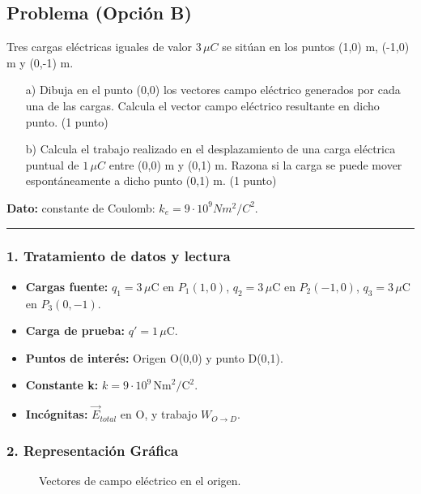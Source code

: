\newpage

\subsection{Problema (Opción B)}
\label{subsec:B4_2016_jun_ord_re}

\begin{cajaenunciado}
Tres cargas eléctricas iguales de valor $3\,\mu C$ se sitúan en los puntos (1,0) m, (-1,0) m y (0,-1) m.
\begin{enumerate}
    \item[a)] Dibuja en el punto (0,0) los vectores campo eléctrico generados por cada una de las cargas. Calcula el vector campo eléctrico resultante en dicho punto. (1 punto)
    \item[b)] Calcula el trabajo realizado en el desplazamiento de una carga eléctrica puntual de $1\,\mu C$ entre (0,0) m y (0,1) m. Razona si la carga se puede mover espontáneamente a dicho punto (0,1) m. (1 punto)
\end{enumerate}
\textbf{Dato:} constante de Coulomb: $k_{e}=9\cdot10^{9}Nm^{2}/C^{2}$.
\end{cajaenunciado}
\hrule

\subsubsection*{1. Tratamiento de datos y lectura}
\begin{itemize}
    \item \textbf{Cargas fuente:} $q_1 = 3\,\mu\text{C}$ en $P_1(1,0)$, $q_2 = 3\,\mu\text{C}$ en $P_2(-1,0)$, $q_3 = 3\,\mu\text{C}$ en $P_3(0,-1)$.
    \item \textbf{Carga de prueba:} $q' = 1\,\mu\text{C}$.
    \item \textbf{Puntos de interés:} Origen O(0,0) y punto D(0,1).
    \item \textbf{Constante k:} $k=9\cdot10^9\,\text{Nm}^2/\text{C}^2$.
    \item \textbf{Incógnitas:} $\vec{E}_{total}$ en O, y trabajo $W_{O \to D}$.
\end{itemize}

\subsubsection*{2. Representación Gráfica}
\begin{figure}[H]
    \centering
    \caption{Vectores de campo eléctrico en el origen.}
\end{figure}

